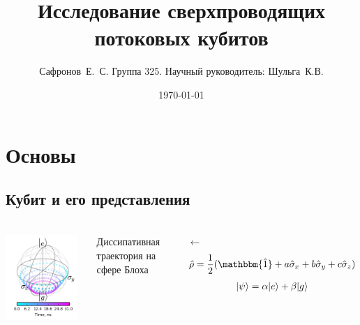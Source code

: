 \documentclass[aspectratio=169, 13pt]{beamer}
\title{Исследование сверхпроводящих потоковых кубитов}
\author{Сафронов~Е.~С. Группа 325. \quad Научный руководитель: Шульга~К.В.}
\date{\today}
\DeclarePairedDelimiter\ket{\lvert}{\rangle}
\begin{document}
{
\begin{frame}[plain]
  \titlepage
\end{frame}
}

\frame[plain]{\tableofcontents}

\section{Основы}
\subsection{Кубит и его представления}
\begin{frame}[c]\frametitle{\secname}\framesubtitle{\subsecname}

\begin{columns}[c]
\centering
\includegraphics[width=0.95\textwidth]{bloch_sphere_dissipative}

Диссипативная траектория на сфере Блоха

\vspace{5cm}
$\leftarrow$
\centering
\begin{gather*}
\hat \rho = \frac{1}{2}(\mathbbm{\hat 1} + a\hat \sigma_x+b\hat \sigma_y + c\hat \sigma_z)
\end{gather*}
\begin{gather*}
\ket{\psi} = \alpha \ket{e} + \beta \ket{g}
\end{gather*}


\end{columns}
\end{frame}
\end{document}
